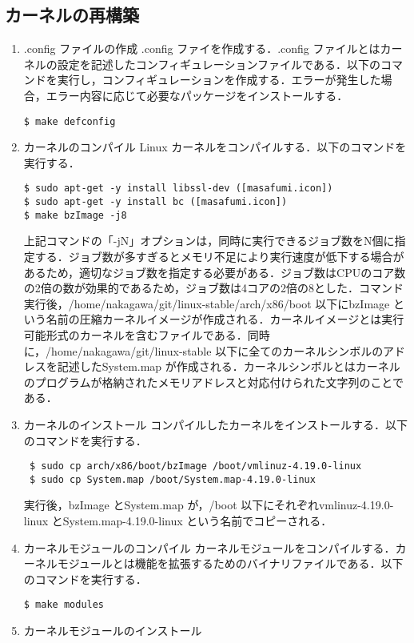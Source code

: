 \documentclass[12pt]{jsarticle}
\begin{document}
\subsection{カーネルの再構築}\label{sec:saikoutiku}
  \begin{enumerate}
  \item .config ファイルの作成
    .config ファイを作成する．.config ファイルとはカーネルの設定を記述したコンフィギュレーションファイルである．以下のコマンドを実行し，コンフィギュレーションを作成する．エラーが発生した場合，エラー内容に応じて必要なパッケージをインストールする．
\begin{verbatim}
$ make defconfig
\end{verbatim}
\item カーネルのコンパイル
  Linux カーネルをコンパイルする．以下のコマンドを実行する．
\begin{verbatim}
$ sudo apt-get -y install libssl-dev ([masafumi.icon])
$ sudo apt-get -y install bc ([masafumi.icon])
$ make bzImage -j8
\end{verbatim}
上記コマンドの「-jN」オプションは，同時に実行できるジョブ数をN個に指定する．ジョブ数が多すぎるとメモリ不足により実行速度が低下する場合があるため，適切なジョブ数を指定する必要がある．ジョブ数はCPUのコア数の2倍の数が効果的であるため，ジョブ数は4コアの2倍の8とした．コマンド実行後，/home/nakagawa/git/linux-stable/arch/x86/boot 以下にbzImage という名前の圧縮カーネルイメージが作成される．カーネルイメージとは実行可能形式のカーネルを含むファイルである．同時に，/home/nakagawa/git/linux-stable 以下に全てのカーネルシンボルのアドレスを記述したSystem.map が作成される．カーネルシンボルとはカーネルのプログラムが格納されたメモリアドレスと対応付けられた文字列のことである．
\item カーネルのインストール
  コンパイルしたカーネルをインストールする．以下のコマンドを実行する．
\begin{verbatim}
 $ sudo cp arch/x86/boot/bzImage /boot/vmlinuz-4.19.0-linux
 $ sudo cp System.map /boot/System.map-4.19.0-linux
\end{verbatim}
実行後，bzImage とSystem.map が，/boot 以下にそれぞれvmlinuz-4.19.0-linux とSystem.map-4.19.0-linux という名前でコピーされる．
\item カーネルモジュールのコンパイル
  カーネルモジュールをコンパイルする．カーネルモジュールとは機能を拡張するためのバイナリファイルである．以下のコマンドを実行する．
\begin{verbatim}
$ make modules
\end{verbatim}
\item カーネルモジュールのインストール

\end{enumerate}
\end{document}
